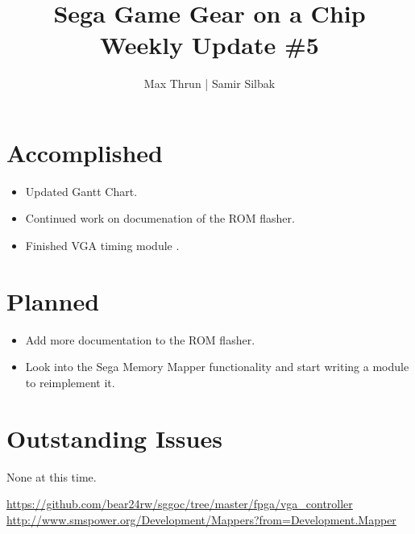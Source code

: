 \documentclass[12pt]{article}
\title{Sega Game Gear on a Chip \\ Weekly Update \#5}
\author{ Max Thrun | Samir Silbak }
\begin{document}
\maketitle

\section*{Accomplished}
\begin{itemize}
    \item Updated Gantt Chart.
    \item Continued work on documenation of the ROM flasher.
    \item Finished VGA timing module\cite{vga_timing} .
\end{itemize}

\section*{Planned}
\begin{itemize}
    \item Add more documentation to the ROM flasher.
    \item Look into the Sega Memory Mapper\cite{mapper} functionality and start writing a module to reimplement it.
\end{itemize}

\section*{Outstanding Issues}
None at this time.

\vspace{.1in}
\begin{thebibliography}{9}
     \url{https://github.com/bear24rw/sggoc/tree/master/fpga/vga_controller}
     \url{http://www.smspower.org/Development/Mappers?from=Development.Mapper}
\end{thebibliography}
\end{document}
